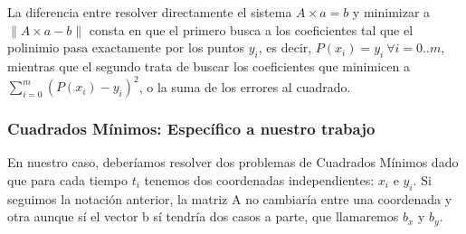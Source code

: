   La diferencia entre resolver directamente el sistema $A \times a = b$ y minimizar a $\| A \times a
  - b \|$ consta en que el primero busca a los coeficientes tal que el polinimio pasa exactamente
  por los puntos $y_i$, es decir, $P(x_i)=y_i \ \forall i= 0..m$, mientras que el segundo trata de
  buscar los coeficientes que minimicen a $\sum_{i=0}^{m} (P(x_i)-y_i)^2$, o la suma de los errores al cuadrado.


%
%
%
%
%

\subsubsection{Cuadrados Mínimos: Específico a nuestro trabajo}
En nuestro caso, deberíamos resolver dos problemas de Cuadrados Mínimos dado que para cada tiempo
$t_i$ tenemos dos coordenadas independientes: $x_i$ e $y_i$. Si seguimos la notación anterior, la
matriz A no cambiaría entre una coordenada y otra aunque sí el vector b sí tendría dos casos a
parte, que llamaremos $b_x$ y $b_y$.

